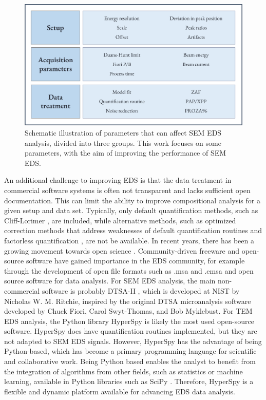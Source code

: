 \begin{figure}[!ht]
  \centering
  \includegraphics[width=0.8\linewidth]{figures/intro_parameters.png}
  \caption{
    Schematic illustration of parameters that can affect SEM EDS analysis, divided into three groups.
    This work focuses on some parameters, with the aim of improving the performance of SEM EDS.
  }
  \label{fig:intro:parameters}
\end{figure}





An additional challenge to improving EDS is that the data treatment in commercial software systems is often not transparent and lacks sufficient open documentation.
This can limit the ability to improve compositional analysis for a given setup and data set.
Typically, only default quantification methods, such as Cliff-Lorimer \cite{CL1975}, are included, while alternative methods, such as optimized correction methods that address weaknesses of default quantification routines and factorless quantification \cite{nilsen_factorless_2021}, are not be available.
In recent years, there has been a growing movement towards open science \cite{opensource_2013}. %
Community-driven freeware and open-source software have gained importance in the EDS community, for example through the development of open file formats such as .msa and .emsa \cite{iso_emsa_22029} and open source software for data analysis.
For SEM EDS analysis, the main non-commercial software is probably DTSA-II \cite{dtsaii_1_getting_started}, which is developed at NIST by Nicholas W. M. Ritchie, inspired by the original DTSA microanalysis software developed by Chuck Fiori, Carol Swyt-Thomas, and Bob Myklebust.
For TEM EDS analysis, the Python library HyperSpy \cite{hyperspy_1.7.1} is likely the most used open-source software. %
HyperSpy does have quantification routines implemented, but they are not adapted to SEM EDS signals.
However, HyperSpy has the advantage of being Python-based, which has become a primary programming language for scientific and collaborative work.
Being Python based enables the analyst to benefit from the integration of algorithms from other fields, such as statistics or machine learning, available in Python libraries such as SciPy \cite{2020SciPy}.
Therefore, HyperSpy is a flexible and dynamic platform available for advancing EDS data analysis.





